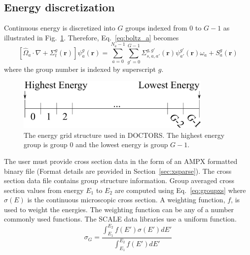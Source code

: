 \subsection{Energy discretization}

Continuous energy is discretized into $G$ groups indexed from 0 to $G-1$ as illustrated in Fig.~\ref{fig:energy_groups}. Therefore, Eq.~\ref{eq:boltz_a} becomes
\begin{equation} \label{eq:boltz_e}
\left[ \hat{\Omega}_a \cdot \nabla + \Sigma_t^g(\boldsymbol{r}) \right]
\psi_{a}^{g}(\boldsymbol{r}) = 
\sum_{a=0}^{N_a-1} \sum_{g'=0}^{G-1} \Sigma_{s, a, a'}^{g, g'}(\boldsymbol{r}) \psi_{a'}^{g'}(\boldsymbol{r}) \omega_a + S_a^g(\boldsymbol{r})
\end{equation}
where the group number is indexed by superscript $g$.

\begin{figure}[tb]
  \begin{center}
   \includegraphics[width=3.75in]{figs/energy_groups}
  \end{center}
  \caption{The energy grid structure used in DOCTORS. The highest energy group is group 0 and the lowest energy is group $G-1$.}
\label{fig:energy_groups}
\end{figure}

The user must provide cross section data in the form of an AMPX formatted binary file (Format details are provided in Section~\ref{sec:xsparse}). The cross section data file contains group structure information. Group averaged cross section values from energy $E_1$ to $E_2$ are computed using Eq.~\ref{eq:groupxs} where $\sigma(E)$ is the continuous microscopic cross section. A weighting function, $f$, is used to weight the energies. The weighting function can be any of a number commonly used functions. The SCALE data libraries use a uniform function.
\begin{equation}\label{eq:groupxs}
\sigma_G = \frac{\int_{E_1}^{E_2}f(E')\sigma(E') dE'}{\int_{E_1}^{E_2} f(E') dE'}
\end{equation}

